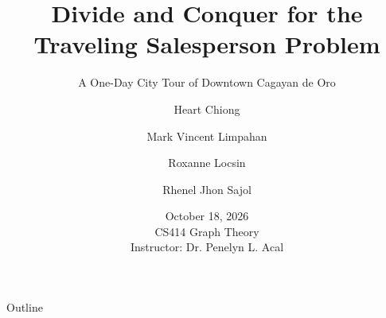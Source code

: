 \documentclass[11pt,aspectratio=169]{beamer}
\title[Divide \& Conquer for TSP]{Divide and Conquer for the\\Traveling Salesperson Problem}
\subtitle{A One-Day City Tour of Downtown Cagayan de Oro}
\author[Chiong, Limpahan, Locsin, Sajol]{Heart Chiong \and Mark Vincent Limpahan \and Roxanne Locsin \and Rhenel Jhon Sajol}
\institute[Graph Theory PIT]{Graph Theory --- Performance Innovative Task (Algorithm 2.8)}
\date{October 18, 2026\\CS414 Graph Theory\\Instructor: Dr. Penelyn L. Acal}
\begin{document}
\begin{frame}
  \titlepage
\end{frame}

\begin{frame}{Outline}
  \tableofcontents
\end{frame}






\end{document}
